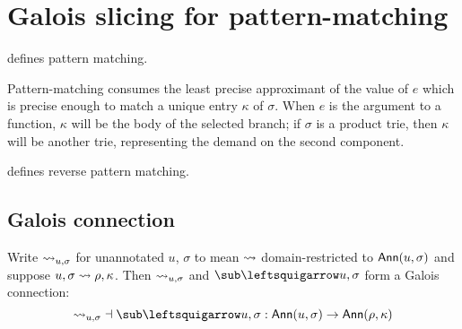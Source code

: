 \section{Galois slicing for pattern-matching}


% 

\begin{definition}
   \label{def:match}
    defines pattern matching.
\end{definition}

Pattern-matching consumes the least precise approximant of the value of $e$
which is precise enough to match a unique entry $\kappa$ of $\sigma$. When $e$
is the argument to a function, $\kappa$ will be the body of the selected branch;
if $\sigma$ is a product trie, then $\kappa$ will be another trie, representing
the demand on the second component.

\begin{definition}
   \label{def:unmatch}
    defines reverse pattern matching.
\end{definition}




\subsection{Galois connection}

\begin{theorem}
\label{thm:gc-pattern-match}

Write $\rightsquigarrow_{u, \sigma}$ for unannotated $u$, $\sigma$ to mean $\rightsquigarrow$
domain-restricted to $\textup{\textsf{Ann}}(u, \sigma)$ and suppose $u, \sigma \rightsquigarrow \rho,
\kappa$. Then $\rightsquigarrow_{u, \sigma}$ and $\unlookupR{u, \sigma}$ form a Galois
connection: \[{\lookupR_{u, \sigma}} \adjoint {\unlookupR{u, \sigma}}: \Ann{u,
\sigma} \to \Ann{\rho, \kappa}\]

\end{theorem}

